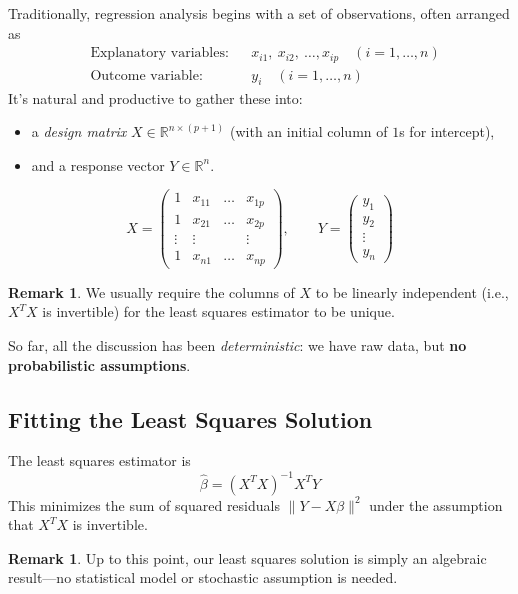 \documentclass[11pt]{article}
\theoremstyle{definition}
\theoremstyle{plain}
\theoremstyle{definition}
\newtheorem{remark}[definition]{Remark}
\begin{document}
Traditionally, regression analysis begins with a set of observations, often arranged as
\[
\begin{aligned}
&\text{Explanatory variables:} &&x_{i1},\ x_{i2},\ \ldots, x_{ip} \quad (i=1,\ldots,n) \\
&\text{Outcome variable:} &&y_i \quad (i=1,\ldots,n)
\end{aligned}
\]
It's natural and productive to gather these into:
\begin{itemize}
    \item a \emph{design matrix} $X \in \mathbb{R}^{n \times (p+1)}$ (with an initial column of $1$s for intercept),
    \item and a response vector $Y \in \mathbb{R}^{n}$.
\end{itemize}
\[
X = 
\begin{pmatrix}
1 & x_{11} & \ldots & x_{1p} \\
1 & x_{21} & \ldots & x_{2p} \\
\vdots & \vdots &  & \vdots \\
1 & x_{n1} & \ldots & x_{np}
\end{pmatrix}, \qquad
Y = 
\begin{pmatrix}
y_1 \\ y_2 \\ \vdots \\ y_n
\end{pmatrix}
\]
\begin{remark}
We usually require the columns of $X$ to be linearly independent (i.e., $X^T X$ is invertible) for the least squares estimator to be unique.
\end{remark}

So far, all the discussion has been \emph{deterministic}: we have raw data, but \textbf{no probabilistic assumptions}.

\subsection{Fitting the Least Squares Solution}

The least squares estimator is
\[
\hat{\beta} = (X^T X)^{-1} X^T Y
\]
This minimizes the sum of squared residuals $\|Y - X\beta\|^2$ under the assumption that $X^T X$ is invertible.

\begin{remark}
Up to this point, our least squares solution is simply an algebraic result—no statistical model or stochastic assumption is needed.
\end{remark}
\end{document}
